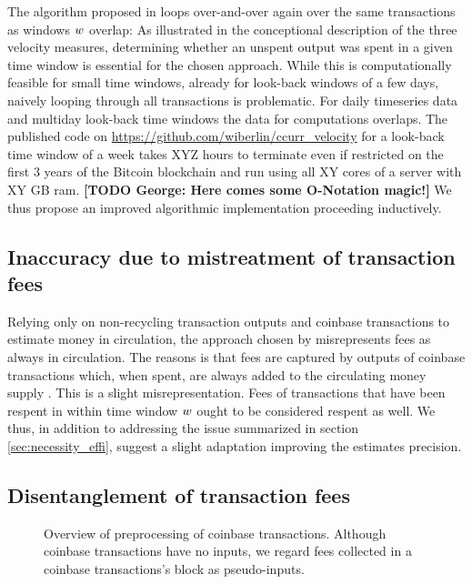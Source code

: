 The algorithm proposed in \cite{pernice2019cryptocurrencies} loops over-and-over again over the same transactions as windows \({w}\) overlap: %
As illustrated in the conceptional description of the three velocity measures, determining whether an unspent output was spent in a given time window is essential for the chosen approach. %
While this is computationally feasible for small time windows, already for look-back windows of a few days, naively looping through all transactions is problematic. %
For daily timeseries data and multiday look-back time windows the data for computations overlaps. %
The published code on \url{https://github.com/wiberlin/ccurr_velocity} for a look-back time window of a week takes XYZ hours to terminate even if restricted on the first 3 years of the Bitcoin blockchain and run using all XY cores of a server with XY GB ram. 
\textbf{[TODO George: Here comes some O-Notation magic!]}
We thus propose an improved algorithmic implementation proceeding inductively. %

\subsection{Inaccuracy due to mistreatment of transaction fees}
\label{sec:inaccuracy_fees}%
Relying only on non-recycling transaction outputs and coinbase transactions to estimate money in circulation, the approach chosen by \cite{pernice2019cryptocurrencies} misrepresents fees as always in circulation. %
The reasons is that fees are captured by outputs of coinbase transactions which, when spent, are always added to the circulating money supply . %
This is a slight misrepresentation. %
Fees of transactions that have been respent in within time window \({w}\) ought to be considered respent as well. %
We thus, in addition to addressing the issue summarized in section \ref{sec:necessity_effi}, suggest a slight adaptation improving the estimates precision. %

\subsection{Disentanglement of  transaction fees}
\label{sec:improve_fees}%
\begin{figure}[t]
	
	\centering
	\caption{Overview of preprocessing of coinbase transactions. Although coinbase transactions have no inputs, we regard fees collected in a coinbase transactions's block as pseudo-inputs.}
\end{figure}



